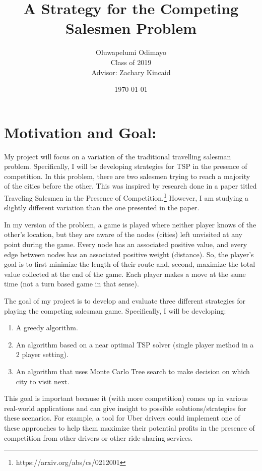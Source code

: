 \documentclass[12pt]{article}%
\begin{document}
	
	\title{A Strategy for the Competing Salesmen Problem} %
	\author{Oluwapelumi Odimayo \\Class of 2019 \\Advisor: Zachary Kincaid} %
	\date{\today}
	\maketitle
	
	\section*{Motivation and Goal:}
	
	My project will focus on a variation of the traditional travelling salesman problem. Specifically, I will be developing strategies for TSP in the presence of competition. In this problem, there are two salesmen trying to reach a majority of the cities before the other. This was inspired by research done in a paper titled Traveling Salesmen in the Presence of Competition.\footnote{https://arxiv.org/abs/cs/0212001} However, I am studying a slightly different variation than the one presented in the paper.\par 
	In my version of the problem, a game is played where neither player knows of the other's location, but they are aware of the nodes (cities) left unvisited at any point during the game. Every node has an associated positive value, and every edge between nodes has an associated positive weight (distance). So, the player's goal is to first minimize the length of their route and, second, maximize the total value collected at the end of the game. Each player makes a move at the same time (not a turn based game in that sense).\par 
	The goal of my project is to develop and evaluate three different strategies for playing the competing salesman game. Specifically, I will be developing:
	
	\begin{enumerate}
		\item A greedy algorithm.
		\item An algorithm based on a near optimal TSP solver (single player method in a 2 player setting).
		\item An algorithm that uses Monte Carlo Tree search to make decision on which city to visit next.
	\end{enumerate} 
	
	This goal is important because it (with more competition) comes up in various real-world applications and can give insight to possible solutions/strategies for these scenarios. For example, a tool for Uber drivers could implement one of these approaches to help them maximize their potential profits in the presence of competition from other drivers or other ride-sharing services.
	
\end{document}
